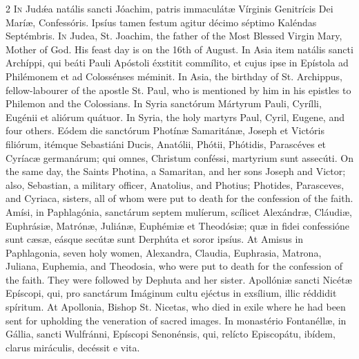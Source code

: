 \begin{paracol}{2}
\lettrine[lines=2]{I}{n} Judǽa natális sancti Jóachim, patris 
 immaculátæ Vírginis Genitrícis Dei Maríæ, Confessóris. Ipsíus tamen 
 festum agitur décimo séptimo Kaléndas Septémbris.
\switchcolumn
{}
\lettrine[lines=2]{I}{n} Judea, St. Joachim, the father of the Most Blessed Virgin Mary, Mother of 
 God. His feast day is on the 16th of August.
\switchcolumn*
{}
In Asia item natális sancti Archíppi, qui beáti Pauli Apóstoli 
 éxstitit 
 commílito, et cujus ipse in Epístola ad Philémonem 
 et ad Colossénses méminit.
\switchcolumn
{}
In Asia, the birthday of St. Archippus, fellow-labourer of the apostle St. 
 Paul, who is mentioned by him in his epistles to Philemon and the 
 Colossians.
\switchcolumn*
{}
In Syria sanctórum Mártyrum Pauli, Cyrílli, Eugénii et aliórum quátuor.
\switchcolumn
{}
In Syria, the holy martyrs Paul, Cyril, Eugene, and four others.
\switchcolumn*
{}
Eódem die sanctórum Photínæ Samaritánæ, Joseph 
 et Victóris filiórum, itémque Sebastiáni Ducis, Anatólii, Phótii, Phótidis, 
 Parascéves et Cyríacæ germanárum; qui omnes, Christum conféssi, martyrium 
 sunt assecúti.
\switchcolumn
{}
On the same day, the Saints Photina, a Samaritan, and her sons Joseph and 
 Victor; also, Sebastian, a military officer, Anatolius, and Photius; 
 Photides, Parasceves, and Cyriaca, sisters, all of whom were put to death 
 for the confession of the faith.
\switchcolumn*
{}
Amísi, in Paphlagónia, sanctárum septem mulíerum, scílicet Alexándræ, 
 Cláudiæ, Euphrásiæ, Matrónæ, Juliánæ, Euphémiæ et Theodósiæ; quæ in fidei 
 confessióne sunt cæsæ, eásque secútæ sunt Derphúta et soror ipsíus.
\switchcolumn
{}
At Amisus in Paphlagonia, seven holy women, Alexandra, Claudia, Euphrasia, 
 Matrona, Juliana, Euphemia, and Theodosia, who were put to death for the 
 confession of the faith. They were followed by Dephuta and her sister.
\switchcolumn*
{}
Apollóniæ sancti Nicétæ Epíscopi, qui, pro 
 sanctárum Imáginum cultu ejéctus in exsílium, illic réddidit spíritum.
\switchcolumn
{}
At Apollonia, Bishop St. Nicetas, who died in exile where he had been sent 
 for upholding the veneration of sacred images.
\switchcolumn*
{}
In monastério Fontanéllæ, in Gállia, sancti 
 Wulfránni, Epíscopi Senonénsis, qui, relícto Episcopátu, ibídem, clarus 
 miráculis, decéssit e vita.

\end{paracol}
